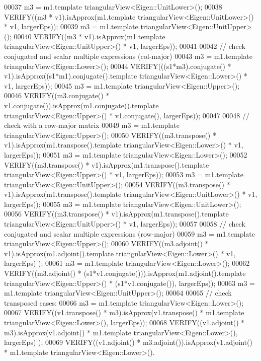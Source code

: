 \begin{DoxyCode}
00037   m3 = m1.template triangularView<Eigen::UnitLower>();
00038   VERIFY((m3 * v1).isApprox(m1.template triangularView<Eigen::UnitLower>() * v1, largerEps));
00039   m3 = m1.template triangularView<Eigen::UnitUpper>();
00040   VERIFY((m3 * v1).isApprox(m1.template triangularView<Eigen::UnitUpper>() * v1, largerEps));
00041 
00042   \textcolor{comment}{// check conjugated and scalar multiple expressions (col-major)}
00043   m3 = m1.template triangularView<Eigen::Lower>();
00044   VERIFY(((s1*m3).conjugate() * v1).isApprox((s1*m1).conjugate().\textcolor{keyword}{template} triangularView<Eigen::Lower>() * 
      v1, largerEps));
00045   m3 = m1.template triangularView<Eigen::Upper>();
00046   VERIFY((m3.conjugate() * v1.conjugate()).isApprox(m1.conjugate().template triangularView<Eigen::Upper>() 
      * v1.conjugate(), largerEps));
00047 
00048   \textcolor{comment}{// check with a row-major matrix}
00049   m3 = m1.template triangularView<Eigen::Upper>();
00050   VERIFY((m3.transpose() * v1).isApprox(m1.transpose().template triangularView<Eigen::Lower>() * v1, 
      largerEps));
00051   m3 = m1.template triangularView<Eigen::Lower>();
00052   VERIFY((m3.transpose() * v1).isApprox(m1.transpose().template triangularView<Eigen::Upper>() * v1, 
      largerEps));
00053   m3 = m1.template triangularView<Eigen::UnitUpper>();
00054   VERIFY((m3.transpose() * v1).isApprox(m1.transpose().template triangularView<Eigen::UnitLower>() * v1, 
      largerEps));
00055   m3 = m1.template triangularView<Eigen::UnitLower>();
00056   VERIFY((m3.transpose() * v1).isApprox(m1.transpose().template triangularView<Eigen::UnitUpper>() * v1, 
      largerEps));
00057 
00058   \textcolor{comment}{// check conjugated and scalar multiple expressions (row-major)}
00059   m3 = m1.template triangularView<Eigen::Upper>();
00060   VERIFY((m3.adjoint() * v1).isApprox(m1.adjoint().template triangularView<Eigen::Lower>() * v1, largerEps)
      );
00061   m3 = m1.template triangularView<Eigen::Lower>();
00062   VERIFY((m3.adjoint() * (s1*v1.conjugate())).isApprox(m1.adjoint().template triangularView<Eigen::Upper>()
       * (s1*v1.conjugate()), largerEps));
00063   m3 = m1.template triangularView<Eigen::UnitUpper>();
00064 
00065   \textcolor{comment}{// check transposed cases:}
00066   m3 = m1.template triangularView<Eigen::Lower>();
00067   VERIFY((v1.transpose() * m3).isApprox(v1.transpose() * m1.template triangularView<Eigen::Lower>(), 
      largerEps));
00068   VERIFY((v1.adjoint() * m3).isApprox(v1.adjoint() * m1.template triangularView<Eigen::Lower>(), largerEps)
      );
00069   VERIFY((v1.adjoint() * m3.adjoint()).isApprox(v1.adjoint() * m1.template triangularView<Eigen::Lower>().

\end{DoxyCode}
